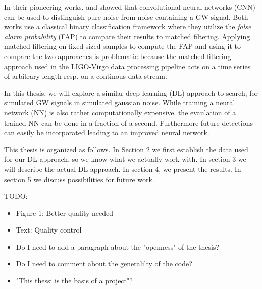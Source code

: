 In their pioneering works, \citeauthor{PhysRevD.97.044039} \cite{PhysRevD.97.044039}
and \citeauthor{PhysRevLett.120.141103} \cite{PhysRevLett.120.141103} showed
that convolutional neural networks (CNN) can be used to distinguish 
pure noise from noise containing a GW signal. Both works use a classical binary
classification framework where they utilize the \textit{false alarm probability}
(FAP) to compare their results to matched filtering. Applying matched filtering
on fixed sized samples to compute the FAP and using it to compare the two
approaches is problematic because the matched filtering approach used in the 
LIGO-Virgo data processing pipeline acts on a time series of arbitrary length
resp. on a continous data stream. \cite{PhysRevD.100.063015}

In this thesis, we will explore a similar deep learning (DL) approach to search,
for simulated GW signals in simulated gaussian noise. While training a 
neural network (NN) is also rather computationally expensive, the evaulation of
a trained NN can be done in a fraction of a second. Furthermore future 
detections can easily be incorporated leading to an improved neural network.

This thesis is organized as follows. In Section 2 we first establish the data
used for our DL approach, so we know what we actually work with. In section 3 
we will describe the actual DL approach. In section 4, we present the results.
In section 5 we discuss possibilities for future work.

TODO: 
\begin{itemize}
  \item Figure 1: Better quality needed
  \item Text: Quality control
  \item Do I need to add a paragraph about the "openness" of the thesis?
  \item Do I need to comment about the generalilty of the code?
  \item "This thessi is the basis of a project"?
\end{itemize}



